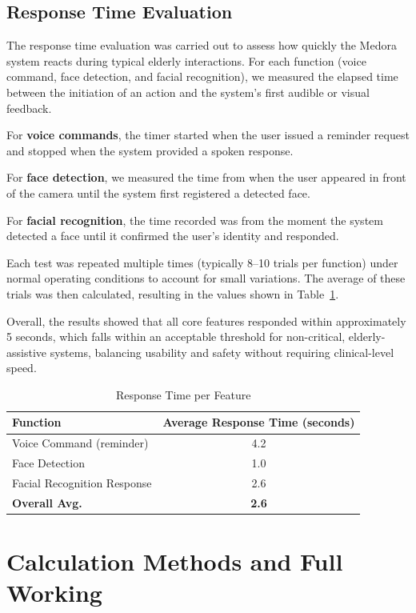 \subsection{Response Time Evaluation}

The response time evaluation was carried out to assess how quickly the Medora system reacts during typical elderly interactions. For each function (voice command, face detection, and facial recognition), we measured the elapsed time between the initiation of an action and the system’s first audible or visual feedback.

For \textbf{voice commands}, the timer started when the user issued a reminder request and stopped when the system provided a spoken response.  

For \textbf{face detection}, we measured the time from when the user appeared in front of the camera until the system first registered a detected face.  

For \textbf{facial recognition}, the time recorded was from the moment the system detected a face until it confirmed the user’s identity and responded.  

Each test was repeated multiple times (typically 8--10 trials per function) under normal operating conditions to account for small variations. The average of these trials was then calculated, resulting in the values shown in Table~\ref{tab:response_time}.  

Overall, the results showed that all core features responded within approximately 5 seconds, which falls within an acceptable threshold for non-critical, elderly-assistive systems, balancing usability and safety without requiring clinical-level speed.  

\begin{table}[H]
\centering
\caption{Response Time per Feature}
\label{tab:response_time}
\begin{tabular}{|l|c|}
\hline
\textbf{Function} & \textbf{Average Response Time (seconds)} \\ \hline
Voice Command (reminder) & 4.2 \\ \hline
Face Detection & 1.0 \\ \hline
Facial Recognition Response & 2.6 \\ \hline
\textbf{Overall Avg.} & \textbf{2.6} \\ \hline
\end{tabular}
\end{table}

\section*{Calculation Methods and Full Working}

